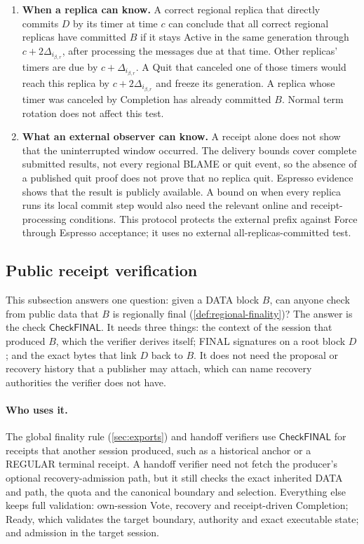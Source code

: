 \documentclass[11pt,a4paper]{article}
\newcommand{\tagg}[1]{\ensuremath{\mathsf{#1}}}
\newcounter{protocol}
\begin{document}
\begin{enumerate}[label=(\arabic*),itemsep=4pt]
\item \textbf{When a replica can know.} A correct regional replica that
directly commits $D$ by its timer at time $c$ can conclude that all
correct regional replicas have committed $B$ if it stays Active in the
same generation through $c+2\Delta_{i_{\beta,r}}$, after processing the
messages due at that time. Other replicas' timers are due by
$c+\Delta_{i_{\beta,r}}$. A Quit that canceled one of those timers would
reach this replica by $c+2\Delta_{i_{\beta,r}}$ and freeze its
generation. A replica whose timer was canceled by Completion has already
committed $B$. Normal term rotation does not affect this test.

\item \textbf{What an external observer can know.} A receipt alone does
not show that the uninterrupted window occurred. The delivery bounds
cover complete submitted results, not every regional BLAME or quit event,
so the absence of a published quit proof does not prove that no replica
quit. Espresso evidence shows that the result is publicly available. A
bound on when every replica runs its local commit step would also need
the relevant online and receipt-processing conditions. This protocol
protects the external prefix against Force through Espresso acceptance;
it uses no external all-replicas-committed test.
\end{enumerate}

\subsection{Public receipt verification}
\label{sec:receipt-kernel}
This subsection answers one question: given a DATA block $B$, can anyone
check from public data that $B$ is regionally final
(\cref{def:regional-finality})? The answer is the check
$\tagg{CheckFINAL}$. It needs three things: the context of the session
that produced $B$, which the verifier derives itself; FINAL signatures
on a root block $D$; and the exact bytes that link $D$ back to $B$. It
does not need the proposal or recovery history that a publisher may
attach, which can name recovery authorities the verifier does not have.

\paragraph{Who uses it.}
The global finality rule (\cref{sec:exports}) and handoff verifiers use
$\tagg{CheckFINAL}$ for receipts that another session produced, such as
a historical anchor or a REGULAR terminal receipt. A handoff verifier
need not fetch the producer's optional recovery-admission path, but it
still checks the exact inherited DATA and path, the quota and the
canonical boundary and selection. Everything else keeps full
validation: own-session Vote, recovery and receipt-driven Completion;
Ready, which validates the target boundary, authority and exact
executable state; and admission in the target session.
\end{document}
